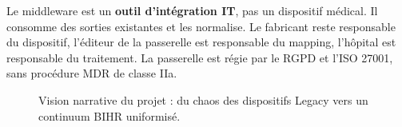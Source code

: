 \begin{bridgekey}
Le middleware est un \textbf{outil d'intégration IT}, pas un dispositif médical. Il consomme des sorties existantes et les normalise. Le fabricant reste responsable du dispositif, l'éditeur de la passerelle est responsable du mapping, l'hôpital est responsable du traitement. La passerelle est régie par le RGPD et l'ISO 27001, sans procédure MDR de classe IIa.
\end{bridgekey}

\begin{figure}[h]
  \centering
  \resizebox{\linewidth}{!}{}
  \caption{Vision narrative du projet : du chaos des dispositifs Legacy vers un continuum BIHR uniformisé.}
  \label{fig:rapport-vision}
\end{figure}
